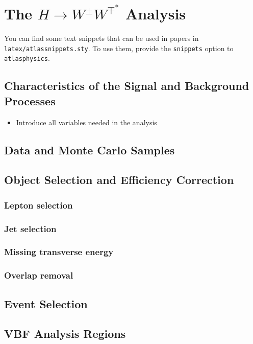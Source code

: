 \chapter{The $H\rightarrow W^{\pm}W^{\mp^*}$ Analysis}
\label{chap:hww}

You can find some text snippets that can be used in papers in \texttt{latex/atlassnippets.sty}.
To use them, provide the \texttt{snippets} option to \texttt{atlasphysics}.

\section{Characteristics of the Signal and Background Processes}
\begin{itemize}
    \item Introduce all variables needed in the analysis
\end{itemize}

\section{Data and Monte Carlo Samples}


\section{Object Selection and Efficiency Correction}
\subsection{Lepton selection}
\subsection{Jet selection}
\subsection{Missing transverse energy}
\subsection{Overlap removal}
\label{subsec:overlap-removal}

\section{Event Selection}
\section{VBF Analysis Regions}
